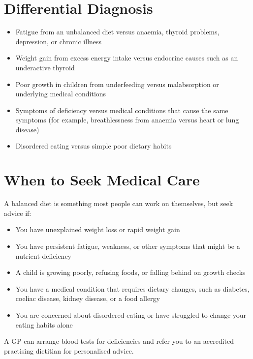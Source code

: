 \section*{Differential Diagnosis}
\begin{itemize}
    \item Fatigue from an unbalanced diet versus anaemia, thyroid problems, depression, or chronic illness
    \item Weight gain from excess energy intake versus endocrine causes such as an underactive thyroid
    \item Poor growth in children from underfeeding versus malabsorption or underlying medical conditions
    \item Symptoms of deficiency versus medical conditions that cause the same symptoms (for example, breathlessness from anaemia versus heart or lung disease)
    \item Disordered eating versus simple poor dietary habits
\end{itemize}

\section*{When to Seek Medical Care}
A balanced diet is something most people can work on themselves, but seek advice if:

\begin{itemize}
    \item You have unexplained weight loss or rapid weight gain
    \item You have persistent fatigue, weakness, or other symptoms that might be a nutrient deficiency
    \item A child is growing poorly, refusing foods, or falling behind on growth checks
    \item You have a medical condition that requires dietary changes, such as diabetes, coeliac disease, kidney disease, or a food allergy
    \item You are concerned about disordered eating or have struggled to change your eating habits alone
\end{itemize}

A GP can arrange blood tests for deficiencies and refer you to an accredited practising dietitian for personalised advice.

